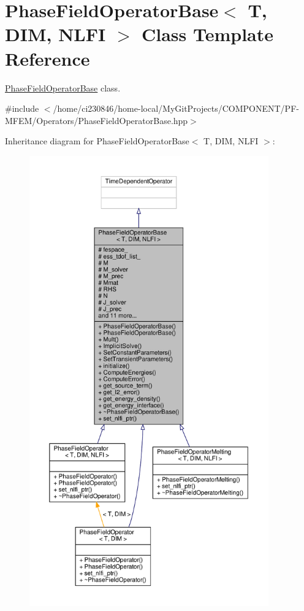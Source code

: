 \hypertarget{classPhaseFieldOperatorBase}{}\section{Phase\+Field\+Operator\+Base$<$ T, D\+IM, N\+L\+FI $>$ Class Template Reference}
\label{classPhaseFieldOperatorBase}


\hyperlink{classPhaseFieldOperatorBase}{Phase\+Field\+Operator\+Base} class.  




{\ttfamily \#include $<$/home/ci230846/home-\/local/\+My\+Git\+Projects/\+C\+O\+M\+P\+O\+N\+E\+N\+T/\+P\+F-\/\+M\+F\+E\+M/\+Operators/\+Phase\+Field\+Operator\+Base.\+hpp$>$}



Inheritance diagram for Phase\+Field\+Operator\+Base$<$ T, D\+IM, N\+L\+FI $>$\+:\nopagebreak
\begin{figure}[H]
\begin{center}
\leavevmode
\includegraphics[height=550pt]{classPhaseFieldOperatorBase__inherit__graph}
\end{center}
\end{figure}


